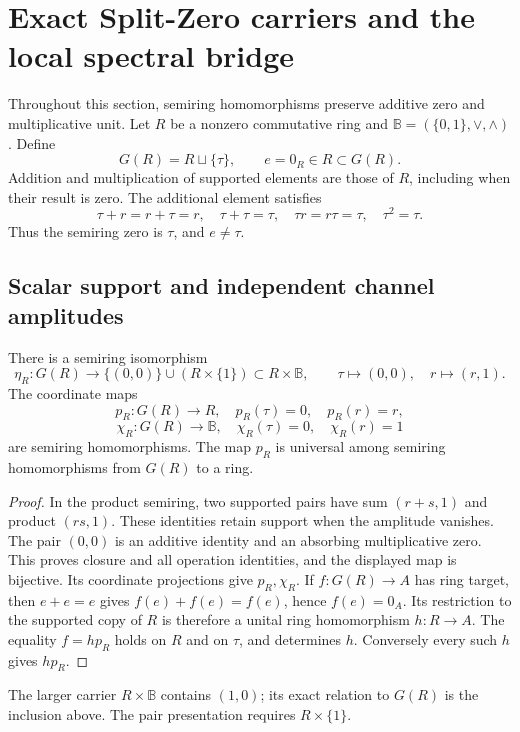 \section{Exact Split-Zero carriers and the local spectral bridge}
\label{sec:split-zero-carriers}

Throughout this section, semiring homomorphisms preserve additive zero and multiplicative unit. Let $R$ be a nonzero commutative ring and $\mathbb B=(\{0,1\},\vee,\wedge)$. Define
\[
G(R)=R\sqcup\{\tau\},\qquad e=0_R\in R\subset G(R).
\]
Addition and multiplication of supported elements are those of $R$, including when their result is zero. The additional element satisfies
\[
\tau+r=r+\tau=r,\quad \tau+\tau=\tau,\quad \tau r=r\tau=\tau,\quad \tau^2=\tau .
\]
Thus the semiring zero is $\tau$, and $e\ne\tau$.

\subsection{Scalar support and independent channel amplitudes}

\begin{proposition}
\label{prop:sz-pair-reflection}
There is a semiring isomorphism
\[
\eta_R:G(R)\longrightarrow \{(0,0)\}\cup(R\times\{1\})\subset R\times\mathbb B,
\qquad \tau\mapsto(0,0),\quad r\mapsto(r,1).
\]
The coordinate maps
\[
p_R:G(R)\to R,\quad p_R(\tau)=0,\quad p_R(r)=r,
\]
\[
\chi_R:G(R)\to\mathbb B,\quad \chi_R(\tau)=0,\quad\chi_R(r)=1
\]
are semiring homomorphisms. The map $p_R$ is universal among semiring homomorphisms from $G(R)$ to a ring.
\end{proposition}
\begin{proof}
In the product semiring, two supported pairs have sum $(r+s,1)$ and product $(rs,1)$. These identities retain support when the amplitude vanishes. The pair $(0,0)$ is an additive identity and an absorbing multiplicative zero. This proves closure and all operation identities, and the displayed map is bijective. Its coordinate projections give $p_R,\chi_R$. If $f:G(R)\to A$ has ring target, then $e+e=e$ gives $f(e)+f(e)=f(e)$, hence $f(e)=0_A$. Its restriction to the supported copy of $R$ is therefore a unital ring homomorphism $h:R\to A$. The equality $f=h p_R$ holds on $R$ and on $\tau$, and determines $h$. Conversely every such $h$ gives $h p_R$.
\end{proof}

The larger carrier $R\times\mathbb B$ contains $(1,0)$; its exact relation to $G(R)$ is the inclusion above. The pair presentation requires $R\times\{1\}$.

